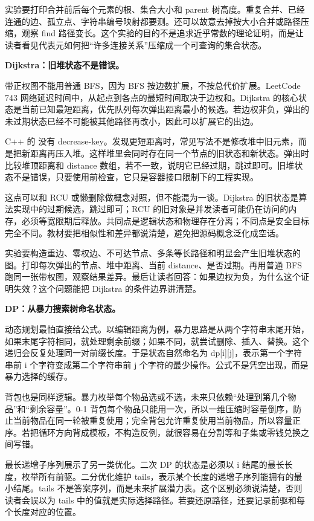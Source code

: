 实验要打印合并前后每个元素的根、集合大小和 parent 树高度。重复合并、已经连通的边、孤立点、字符串编号映射都要测。还可以故意去掉按大小合并或路径压缩，观察 find 路径变长。这个实验的目的不是追求近乎常数的理论证明，而是让读者看见代表元如何把“许多连接关系”压缩成一个可查询的集合状态。

\noindent\textbf{Dijkstra：旧堆状态不是错误。}

带正权图不能用普通 BFS，因为 BFS 按边数扩展，不按总代价扩展。LeetCode 743 网络延迟时间中，从起点到各点的最短时间取决于边权和。Dijkstra 的核心状态是当前已知最短距离，优先队列每次弹出距离最小的候选。若边权非负，弹出的未过期状态已经不可能被其他路径再改小，因此可以扩展它的出边。

C++ 的  没有 decrease-key。发现更短距离时，常见写法不是修改堆中旧元素，而是把新距离再压入堆。这样堆里会同时存在同一个节点的旧状态和新状态。弹出时比较堆顶距离和 distance 数组，若不一致，说明它已经过期，跳过即可。旧堆状态不是错误，只要使用前检查，它只是容器接口限制下的工程实现。

这点可以和 RCU 或懒删除做概念对照，但不能混为一谈。Dijkstra 的旧状态是算法实现中的过期候选，跳过即可；RCU 的旧对象是并发读者可能仍在访问的内存，必须等宽限期后释放。共同点是逻辑状态和物理存在分离；不同点是安全目标完全不同。教材要把相似性和差异都说清楚，避免把源码概念泛化成空话。

实验要构造重边、零权边、不可达节点、多条等长路径和明显会产生旧堆状态的图。打印每次弹出的节点、堆中距离、当前 distance、是否过期。再用普通 BFS 跑同一张带权图，观察结果差异。最后让读者回答：如果边权为负，为什么这个证明失效？这个问题能把 Dijkstra 的条件边界讲清楚。

\noindent\textbf{DP：从暴力搜索树命名状态。}

动态规划最怕直接给公式。以编辑距离为例，暴力思路是从两个字符串末尾开始，如果末尾字符相同，就处理剩余前缀；如果不同，就尝试删除、插入、替换。这个递归会反复处理同一对前缀长度。于是状态自然命名为 dp[i][j]，表示第一个字符串前 i 个字符变成第二个字符串前 j 个字符的最少操作。公式不是凭空出现，而是暴力选择的缓存。

背包也是同样逻辑。暴力枚举每个物品选或不选，未来只依赖“处理到第几个物品”和“剩余容量”。0-1 背包每个物品只能用一次，所以一维压缩时容量倒序，防止当前物品在同一轮被重复使用；完全背包允许重复使用当前物品，所以容量正序。若把循环方向背成模板，不构造反例，就很容易在分割等和子集或零钱兑换之间写错。

最长递增子序列展示了另一类优化。二次 DP 的状态是必须以 i 结尾的最长长度，枚举所有前驱。二分优化维护 tails，表示某个长度的递增子序列能拥有的最小结尾。tails 不是答案序列，而是未来扩展潜力表。这个区别必须说清楚，否则读者会误以为 tails 中的值就是实际选择路径。若要还原路径，还要记录前驱和每个长度对应的位置。

